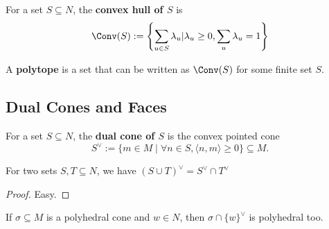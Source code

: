 \begin{definition}
  \label{1-2-2-convex-hull}
  \uses{}
  \leanok
  For a set $S \subseteq N$, the {\bf convex hull of $S$} is
  $$\Conv(S) := \left\{\sum_{u \in S} \lambda_u | \lambda_u \ge 0, \sum_u \lambda_u = 1\right\}$$
\end{definition}

\begin{definition}[Polytope]
  \label{1-2-2-polytope}
  \leanok
  A {\bf polytope} is a set that can be written as $\Conv(S)$ for
  some finite set $S$.
\end{definition}

\subsection{Dual Cones and Faces}

\begin{definition}
  \label{1-2-2-dual-cone}
  \leanok
  For a set \( S \subseteq N \), the {\bf dual cone of \( S \)} is
  the convex pointed cone
  \[
      S^\vee := \{m \in M \mid \forall n \in S, \langle n, m \rangle
      \geq 0 \} \subseteq M.
  \]
\end{definition}

\begin{proposition}
  \label{1-2-2-dual-cone-union}
  \leanok
  For two sets \( S, T \subseteq N \), we have \( (S \cup T)^\vee =
  S^\vee \cap T^\vee \)
\end{proposition}

\begin{proof}
  \uses{}
  \leanok
  Easy.
\end{proof}

\begin{proposition}
  \label{1-2-2-fourier-motzkin}
  \leanok
  If \( \sigma \subseteq M \) is a polyhedral cone and \( w \in N \), then 
  \( \sigma \cap \{w\}^\vee \) is polyhedral too.
\end{proposition}

